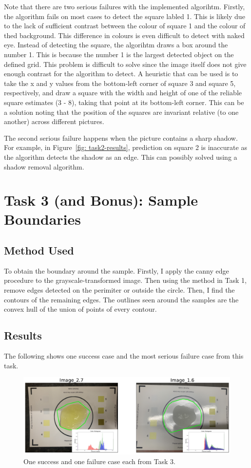\documentclass[12pt]{article}
\begin{document}
Note that there are two serious failures with the implemented algorihtm. Firstly, the algorithm fails on most cases to detect the square labled 1. This is likely due to the lack of sufficient contrast between the colour of square 1 and the colour of thed background. This difference in colours is even difficult to detect with naked eye. Instead of detecting the square, the algorihtm draws a box around the number 1. This is because the number 1 is the largest detected object on the defined grid. This problem is difficult to solve since the image itself does not give enough contrast for the algorithm to detect. A heuristic that can be used is to take the x and y values from the bottom-left corner of square 3 and square 5, respectively, and draw a square with the width and height of one of the reliable square estimates (3 - 8), taking that point at its bottom-left corner. This can be a solution noting that the position of the squares are invariant relative (to one another) across different pictures.

The second serious failure happens when the picture contains a sharp shadow. For example, in Figure~\ref{fig: task2-results}, prediction on square 2 is inaccurate as the algorithm detects the shadow as an edge. This can possibly solved using a shadow removal algorithm.

\section{Task 3 (and Bonus): Sample Boundaries}
\subsection{Method Used}
To obtain the boundary around the sample. Firstly, I apply the canny edge procedure to the grayscale-transformed image. Then using the method in Task 1, remove edges detected on the perimiter or outside the circle. Then, I find the contours of the remaining edges. The outlines seen around the samples are the convex hull of the union of points of every contour.

\subsection{Results}
The following shows one success case and the most serious failure case from this task.
\begin{figure}[H]
\centerline{\includegraphics[width=.85\textwidth]{figs/task3-results.pdf}} 
	\caption{One success and one failure case each from Task 3.}
	\label{fig: task3-results}
\end{figure}
\end{document}

